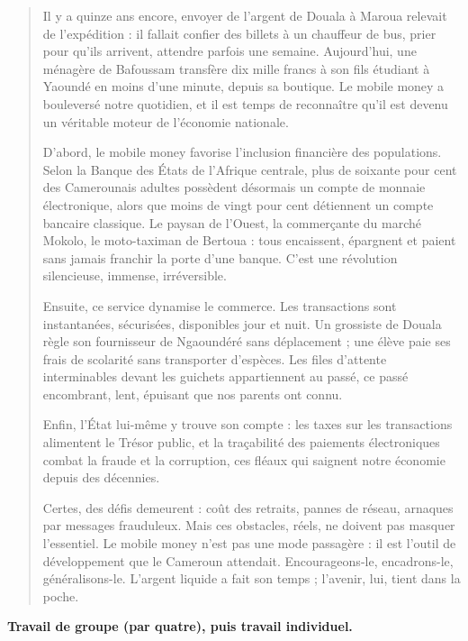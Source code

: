 \documentclass[11pt]{article}
\newcounter{popsec}
\newcounter{popsub}
\newcommand{\courssub}[1]{%
  \stepcounter{popsub}%
  \par\vspace{9pt}\noindent{\popxbold\fontsize{11.5}{13}\selectfont\color{popink}{\color{poporange}\thepopsec.\thepopsub}\hspace{6pt}#1}\par\nopagebreak\vspace{4pt}
}
\begin{document}
\begin{quote}
Il y a quinze ans encore, envoyer de l'argent de Douala à Maroua relevait de l'expédition : il fallait confier des billets à un chauffeur de bus, prier pour qu'ils arrivent, attendre parfois une semaine. Aujourd'hui, une ménagère de Bafoussam transfère dix mille francs à son fils étudiant à Yaoundé en moins d'une minute, depuis sa boutique. Le mobile money a bouleversé notre quotidien, et il est temps de reconnaître qu'il est devenu un véritable moteur de l'économie nationale.

D'abord, le mobile money favorise l'inclusion financière des populations. Selon la Banque des États de l'Afrique centrale, plus de soixante pour cent des Camerounais adultes possèdent désormais un compte de monnaie électronique, alors que moins de vingt pour cent détiennent un compte bancaire classique. Le paysan de l'Ouest, la commerçante du marché Mokolo, le moto-taximan de Bertoua : tous encaissent, épargnent et paient sans jamais franchir la porte d'une banque. C'est une révolution silencieuse, immense, irréversible.

Ensuite, ce service dynamise le commerce. Les transactions sont instantanées, sécurisées, disponibles jour et nuit. Un grossiste de Douala règle son fournisseur de Ngaoundéré sans déplacement ; une élève paie ses frais de scolarité sans transporter d'espèces. Les files d'attente interminables devant les guichets appartiennent au passé, ce passé encombrant, lent, épuisant que nos parents ont connu.

Enfin, l'État lui-même y trouve son compte : les taxes sur les transactions alimentent le Trésor public, et la traçabilité des paiements électroniques combat la fraude et la corruption, ces fléaux qui saignent notre économie depuis des décennies.

Certes, des défis demeurent : coût des retraits, pannes de réseau, arnaques par messages frauduleux. Mais ces obstacles, réels, ne doivent pas masquer l'essentiel. Le mobile money n'est pas une mode passagère : il est l'outil de développement que le Cameroun attendait. Encourageons-le, encadrons-le, généralisons-le. L'argent liquide a fait son temps ; l'avenir, lui, tient dans la poche.
\end{quote}

\courssub{Consignes de travail}

\textbf{Travail de groupe (par quatre), puis travail individuel.}
\end{document}
